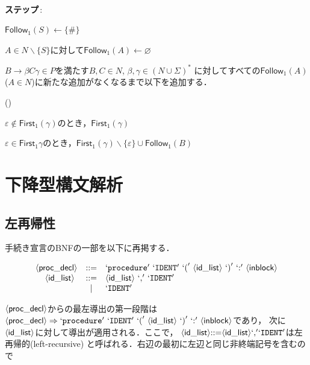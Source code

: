 \documentclass[a4j,dvipdfmx]{jbook}
\begin{document}
\begin{Alg}\
  \begin{list}{{\bf ステップ}\,{\rm {}:}}{}
    \item $\mathsf{Follow}_1(S)\leftarrow\{\#\}$
    \item $A\in N\backslash\{S\}$に対して$\mathsf{Follow}_1(A)\leftarrow\varnothing$
    \item
          $B\rightarrow\beta C\gamma\in P$を満たす$B,C\in N$, $\beta,\gamma\in(N\cup\Sigma)^\ast$
          に対してすべての$\mathsf{Follow}_1(A)$($A\in N$)に新たな追加がなくなるまで以下を追加する．
          \begin{list}{(\alph{bean})}{\usecounter{bean}}
            \item $\varepsilon\notin\mathsf{First}_1(\gamma)$のとき，$\mathsf{First}_1(\gamma)$
            \item $\varepsilon\in\mathsf{First}_1{\gamma}$のとき，$\mathsf{First}_1(\gamma)\backslash\{\varepsilon\}\cup\mathsf{Follow}_1(B)$
          \end{list}
  \end{list}
\end{Alg}

\section{下降型構文解析}

\subsection{左再帰性}

手続き宣言のBNFの一部を以下に再掲する．

\[\begin{array}{rcl}
    \NTerm{proc\_decl} & \mathtt{::=} & \Term{procedure}\ \Term{IDENT}\ \Term{(}\
    \NTerm{id\_list}\ \Term{)}\ \Term{:}\ \NTerm{inblock}                         \\
    \NTerm{id\_list}\  & \mathtt{::=} & \NTerm{id\_list}\ \Term{,}\ \Term{IDENT}  \\
                       & |            & \Term{IDENT}                              \\
  \end{array}\]

$\langle{\mbox{$\mathsf{proc\_decl}$}}\rangle$からの最左導出の第一段階は
$\NTerm{proc\_decl}\Rightarrow\Term{procedure}\ \Term{IDENT}\ \Term{(}\ \NTerm{id\_list}\ \Term{)}\ \Term{:}\ \NTerm{inblock}$であり，
次に$\langle{\mbox{$\mathsf{id\_list}$}}\rangle$に対して導出が適用される．ここで，
$\langle{\mbox{$\mathsf{id\_list}$}}\rangle\mathtt{::=}\langle{\mbox{$\mathsf{id\_list}$}}\rangle`\mbox{$\mathtt{,}$}'`\mbox{$\mathtt{IDENT}$}'$は左再帰的(left-recursive)
と呼ばれる．右辺の最初に左辺と同じ非終端記号を含むので
\end{document}
